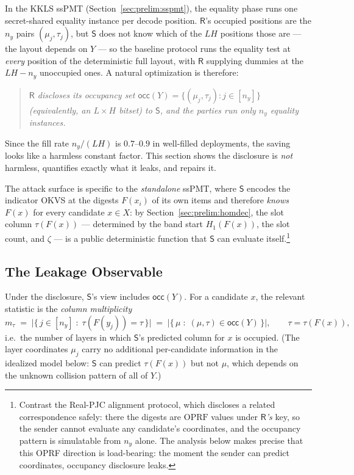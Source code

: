 \documentclass[runningheads]{llncs}
\newcommand{\Snd}{\mathsf{S}}                %
\newcommand{\Rcv}{\mathsf{R}}                %
\newcommand{\half}{H}                        %
\newcommand{\occ}{\mathsf{occ}}
\begin{document}
In the KKLS ssPMT (Section~\ref{sec:prelim:sspmt}), the equality phase runs one
secret-shared equality instance per decode position. $\Rcv$'s occupied positions are
the $n_y$ pairs $(\mu_j,\tau_j)$, but $\Snd$ does not know which of the $L\half$
positions those are --- the layout depends on $Y$ --- so the baseline protocol runs
the equality test at \emph{every} position of the deterministic full layout, with
$\Rcv$ supplying dummies at the $L\half-n_y$ unoccupied ones. A natural optimization
is therefore:
\begin{quote}
  \emph{$\Rcv$ discloses its occupancy set
  $\occ(Y)=\{(\mu_j,\tau_j):j\in[n_y]\}$ (equivalently, an $L\times\half$ bitset)
  to $\Snd$, and the parties run only $n_y$ equality instances.}
\end{quote}
Since the fill rate $n_y/(L\half)$ is $0.7$--$0.9$ in well-filled deployments, the
saving looks like a harmless constant factor. This section shows the disclosure is
\emph{not} harmless, quantifies exactly what it leaks, and repairs it.

The attack surface is specific to the \emph{standalone} ssPMT, where $\Snd$ encodes
the indicator OKVS at the digests $F(x_i)$ of its own items and therefore
\emph{knows} $F(x)$ for every candidate $x\in X$: by
Section~\ref{sec:prelim:homdec}, the slot column
$\tau(F(x))$ --- determined by the band start $H_1(F(x))$, the slot count, and
$\zeta$ --- is a public deterministic function that $\Snd$ can evaluate
itself.\footnote{Contrast the Real-PJC alignment protocol, which discloses a related
correspondence safely: there the digests are $\mathrm{OPRF}$ values under
\emph{$\Rcv$'s} key, so the sender cannot evaluate any candidate's coordinates, and
the occupancy pattern is simulatable from $n_y$ alone. The analysis below makes
precise that this OPRF direction is load-bearing: the moment the sender can predict
coordinates, occupancy disclosure leaks.}

\subsection{The Leakage Observable}
\label{sec:leak:observable}

Under the disclosure, $\Snd$'s view includes $\occ(Y)$. For a candidate $x$, the
relevant statistic is the \emph{column multiplicity}
\[
  m_\tau \;=\; \big|\{\,j\in[n_y] \;:\; \tau(F(y_j))=\tau\,\}\big|
  \;=\; \big|\{\,\mu \;:\; (\mu,\tau)\in\occ(Y)\,\}\big|,
  \qquad \tau=\tau(F(x)),
\]
i.e.\ the number of layers in which $\Snd$'s predicted column for $x$ is occupied.
(The layer coordinates $\mu_j$ carry no additional per-candidate information in the
idealized model below: $\Snd$ can predict $\tau(F(x))$ but not $\mu$, which depends
on the unknown collision pattern of all of $Y$.)
\end{document}

